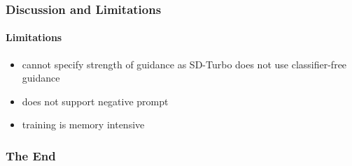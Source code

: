 \documentclass[aspectratio=169, lecture, amberg]{OTHAWbeamer}
\begin{document}
\begin{frame}
\frametitle{Discussion and Limitations}
\framesubtitle{Limitations}
\begin{itemize}
    \item cannot specify strength of guidance as SD-Turbo does not use classifier-free guidance
    \item does not support negative prompt
    \item training is memory intensive
\end{itemize}

\end{frame}

\begin{frame}
\frametitle{The End}
\begin{center}
\scalebox{2}{Questions?}
\end{center}
\end{frame}
\end{document}
